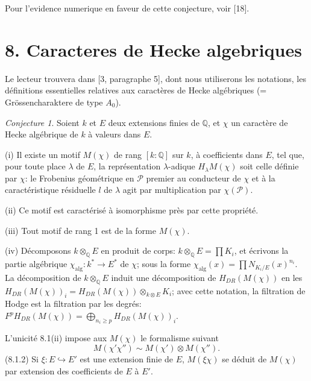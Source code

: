 \documentclass[12pt,a4paper]{article}
\theoremstyle{plain}
\theoremstyle{definition}
\theoremstyle{remark}
\newtheorem{conjecture}[definition]{Conjecture}
\newcommand{\Q}{\mathbb{Q}}
\begin{document}
Pour l'evidence numerique en faveur de cette conjecture, voir [18].


\section*{8. Caracteres de Hecke algebriques}

Le lecteur trouvera dans [3, paragraphe 5], dont nous utiliserons les notations, les
d\'efinitions essentielles relatives aux caract\`eres de Hecke alg\'ebriques (= Gr\"ossencharaktere
 de type $A_0$).

\begin{conjecture}\label{conj:8.1}
Soient $k$ et $E$ deux extensions finies de $\Q$, et $\chi$ un caract\`ere de Hecke alg\'ebrique
 de $k$ \`a valeurs dans $E$.

\textup{(i)} Il existe un motif $M(\chi)$ de rang $[k:\Q]$ sur $k$, \`a coefficients dans $E$, tel que,
pour toute place $\lambda$ de $E$, la repr\'esentation $\lambda$-adique $H_\lambda M(\chi)$ soit celle
d\'efinie par $\chi$: le Frobenius g\'eom\'etrique en $\mathcal{P}$ premier au conducteur de $\chi$ et \`a la
caract\'eristique r\'esiduelle $l$ de $\lambda$ agit par multiplication par $\chi(\mathcal{P})$.

\textup{(ii)} Ce motif est caract\'eris\'e \`a isomorphisme pr\`es par cette propri\'et\'e.

\textup{(iii)} Tout motif de rang 1 est de la forme $M(\chi)$.

\textup{(iv)} D\'ecomposons $k \otimes_\Q E$ en produit de corps: $k \otimes_\Q E = \prod K_i$, et \'ecrivons la partie
alg\'ebrique $\chi_{\text{alg}}: k^* \to E^*$ de $\chi$; sous la forme
$\chi_{\text{alg}}(x) = \prod N_{K_i/E}(x)^{n_i}$. La d\'ecomposition de $k \otimes_\Q E$ induit une d\'ecomposition
de $H_{DR}(M(\chi))$ en les $H_{DR}(M(\chi))_i = H_{DR}(M(\chi)) \otimes_{k \otimes E} K_i$;
avec cette notation, la filtration de Hodge est la filtration par les degr\'es:
$F^p H_{DR}(M(\chi)) = \bigoplus_{n_i \geq p} H_{DR}(M(\chi))_i$.
\end{conjecture}


L'unicit\'e 8.1(ii) impose aux $M(\chi)$ le formalisme suivant
\begin{equation}\label{eq:8.1.1}
M(\chi' \chi'') \sim M(\chi') \otimes M(\chi'').
\end{equation}
(8.1.2) Si $\xi: E \hookrightarrow E'$ est une extension finie de $E$, $M(\xi\chi)$ se d\'eduit de $M(\chi)$
par extension des coefficients de $E$ \`a $E'$.
\end{document}
